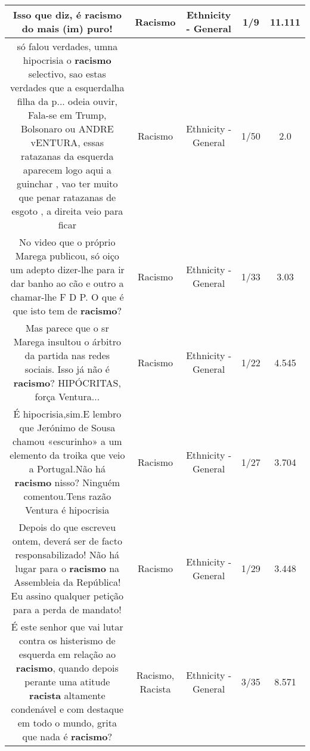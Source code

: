\documentclass[11pt]{article}
\newlength\mylength
\begin{document}
\begin{center}
\begin{longtable}{|C{.65\mylength}|C{.30\mylength}|C{.12\mylength}|C{.12\mylength}|C{.12\mylength}|}
  \small Isso que diz, é \textbf{racismo} do mais (im) puro!\normalsize   & Racismo & Ethnicity - General & 1/9 & 11.111 \\  \hline
  \small só falou verdades, umna hipocrisia o \textbf{racismo} selectivo, sao estas verdades que a esquerdalha filha da p...   odeia ouvir, Fala-se em Trump, Bolsonaro ou ANDRE vENTURA, essas ratazanas da esquerda aparecem logo aqui a guinchar  , vao ter muito que penar  ratazanas de esgoto , a direita veio para ficar\normalsize   & Racismo & Ethnicity - General & 1/50 & 2.0 \\  \hline
  \small No video que o próprio Marega publicou, só oiço um adepto dizer-lhe para ir dar banho ao cão e outro a chamar-lhe F D P. O que é que isto tem de \textbf{racismo}?\normalsize   & Racismo & Ethnicity - General & 1/33 & 3.03 \\  \hline
  \small Mas parece que o sr Marega insultou o árbitro da partida nas redes sociais. Isso já não é \textbf{racismo}? HIPÓCRITAS, força Ventura...\normalsize   & Racismo & Ethnicity - General & 1/22 & 4.545 \\  \hline
  \small É hipocrisia,sim.E lembro que Jerónimo de Sousa chamou «escurinho» a um elemento da troika que veio a Portugal.Não há \textbf{racismo} nisso? Ninguém comentou.Tens razão Ventura é hipocrisia\normalsize   & Racismo & Ethnicity - General & 1/27 & 3.704 \\  \hline
  \small Depois do que escreveu ontem, deverá ser de facto responsabilizado! Não há lugar para o \textbf{racismo} na Assembleia da República! Eu assino qualquer petição para a perda de mandato!\normalsize   & Racismo & Ethnicity - General & 1/29 & 3.448 \\  \hline
  \small É este senhor que vai lutar contra os histerismo de esquerda em relação ao \textbf{racismo}, quando depois perante uma atitude \textbf{racista} altamente condenável e com destaque em todo o mundo, grita que nada é \textbf{racismo}?\normalsize   & Racismo, Racista & Ethnicity - General & 3/35 & 8.571 \\  \hline

\end{longtable}
\end{center}
\end{document}
